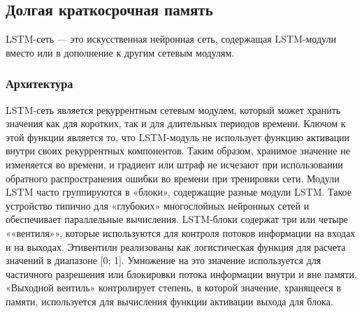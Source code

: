 \subsection{Долгая краткосрочная память}
LSTM-сеть — это искусственная нейронная сеть, содержащая LSTM-модули вместо или в дополнение к другим сетевым модулям.

\subsubsection{Архитектура}
LSTM-сеть является рекуррентным сетевым модулем, который может хранить значения как для коротких, так и для длительных периодов времени. Ключом к этой функции является то, что LSTM-модуль не использует функцию активации внутри своих рекуррентных компонентов. Таким образом, хранимое значение не изменяется во времени, и градиент или штраф не исчезают при использовании об­ратного распространения ошибки во времени при тренировки сети.
Модули LSTM часто группируются в «блоки», содержащие разные модули LSTM. Такое устройство типично для «глубоких» многослойных нейронных сетей и обеспечивает параллельные вычисления.
LSTM-блоки содержат три или четыре ««вентиля»», которые используются для контроля потоков информации на входах и на вы­ходах. Этивентили реализованы как логистическая функция для расчета значений в диапазоне [0; 1]. Умножение на это значение используется для частичного разрешения или блокировки потока информации внутри и вне памяти.  «Выходной вентиль» контролирует степень, в которой значение, хранящееся в памяти, используется для вычисления функции активации выхода для блока. 

